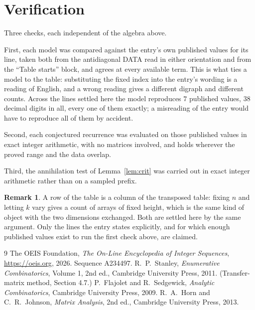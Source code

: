 \documentclass[11pt,a4paper]{article}
\theoremstyle{plain}
\theoremstyle{definition}
\newtheorem{remark}[theorem]{Remark}
\begin{document}
\section{Verification}

Three checks, each independent of the algebra above.

First, each model was compared against the entry's own published values for its line, taken
both from the antidiagonal DATA read in either orientation and from the ``Table starts''
block, and agrees at every available term. This is what ties a model to the table:
substituting the fixed index into the entry's wording is a reading of English, and a wrong
reading gives a different digraph and different counts. Across the lines settled here the
model reproduces $7$ published values, $38$ decimal digits in all, every one of
them exactly; a misreading of the entry would have to reproduce all of them by accident.

Second, each conjectured recurrence was evaluated on those published values in exact
integer arithmetic, with no matrices involved, and holds wherever the proved range and the
data overlap.

Third, the annihilation test of Lemma~\ref{lem:crit} was carried out in exact integer
arithmetic rather than on a sampled prefix.

\begin{remark}
A row of the table is a column of the transposed table: fixing $n$ and letting $k$ vary gives a
count of arrays of fixed height, which is the same kind of object with the two dimensions
exchanged. Both are settled here by the same argument. Only the lines the entry states
explicitly, and for which enough published values exist to run the first check above, are
claimed.
\end{remark}

\begin{thebibliography}{9}
 The OEIS Foundation, \emph{The On-Line Encyclopedia of Integer
Sequences}, \url{https://oeis.org}, 2026. Sequence A234497.
 R.~P.~Stanley, \emph{Enumerative Combinatorics}, Volume 1, 2nd ed.,
Cambridge University Press, 2011. (Transfer-matrix method, Section 4.7.)
 P.~Flajolet and R.~Sedgewick, \emph{Analytic Combinatorics}, Cambridge
University Press, 2009.
 R.~A.~Horn and C.~R.~Johnson, \emph{Matrix Analysis}, 2nd ed., Cambridge
University Press, 2013.
\end{thebibliography}
\end{document}
